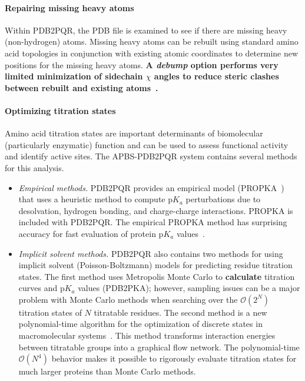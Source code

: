 \documentclass[12pt,titlepage]{article}
\newcommand{\revision}[1]{\color{red} \textbf{#1} \leavevmode\color{black}}
\begin{document}
\paragraph{Repairing missing heavy atoms}
Within PDB2PQR, the PDB file is examined to see if there are missing heavy (non-hydrogen) atoms.
Missing heavy atoms can be rebuilt using standard amino acid topologies in conjunction with existing atomic coordinates to determine new positions for the missing heavy atoms.
\revision{A \textit{debump} option performs very limited minimization of sidechain $\chi$ angles to reduce steric clashes between rebuilt and existing atoms~\cite{Dolinsky2004}.}

\paragraph{Optimizing titration states}
Amino acid tit\-rat\-ion states are important determinants of bio\-molecular (particularly enzymatic) function and can be used to assess functional activity and identify active sites.
The APBS-PDB2PQR system contains several methods for this analysis.
\begin{itemize}
	\item \textit{Empirical methods.}
	PDB2PQR provides an empirical model (PROPKA~\cite{Sondergaard2011}) that uses a heuristic method to compute p$K_a$ perturbations due to desolvation, hydrogen bonding, and charge-charge interactions.
	PROPKA is included with PDB2PQR.
	The empirical PROPKA method has surprising accuracy for fast evaluation of protein p$K_a$ values~\cite{Li2005}.
	\item \textit{Implicit solvent methods.}
	PDB2PQR also contains two methods for using implicit solvent (Poisson-Boltzmann) models for predicting residue titration states.
	The first method uses Metropolis Monte Carlo to \revision{calculate} titration curves and p$K_a$ values (PDB2PKA); however, sampling issues can be a major problem with Monte Carlo methods when searching over the $\mathcal{O}\left(2^N\right)$ titration states of $N$ titratable residues.
	The second method is a new polynomial-time algorithm for the optimization of discrete states in macromolecular systems~\cite{Purvine2016}.
	This method transforms interaction energies between titratable groups into a graphical flow network.
	The polynomial-time $\mathcal{O}\left(N^4\right)$ behavior makes it possible to rigorously evaluate titration states for much larger proteins than Monte Carlo methods.
\end{itemize}
\end{document}
